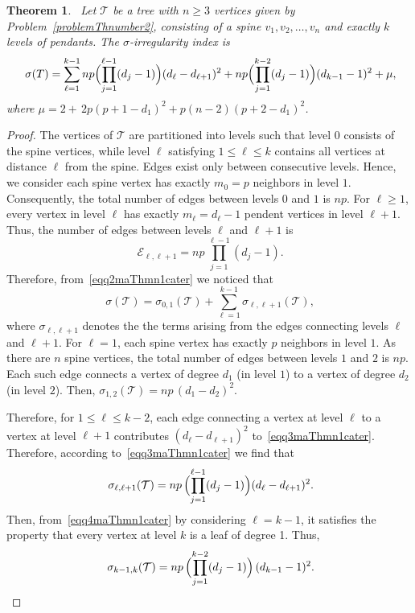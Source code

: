 \documentclass[12pt, a4paper]{article}
\theoremstyle{plain}  %
\newtheorem{theorem}{Theorem}[section]
\theoremstyle{definition}  %
\newcommand{\TT}{\mathcal{T}}
\begin{document}
\begin{theorem}~\label{maThmn1cater}
Let $\TT$ be a tree with $n \geq 3$ vertices given by Problem~\ref{problemThnumber2}, consisting of a spine $v_1, v_2, \dots, v_n$ and exactly $k$ levels of pendants. The $\sigma$-irregularity index is
\begin{equation}~\label{eqq1maThmn1cater}
\sigma(T)=\sum_{\ell=1}^{k-1} np\Bigl(\prod_{j=1}^{\ell-1}(d_j-1)\Bigr)(d_\ell-d_{\ell+1})^2+np\Bigl(\prod_{j=1}^{k-2}(d_j-1)\Bigr)(d_{k-1}-1)^2+\mu,
\end{equation}
where $\mu=2+\,2p(p+1-d_1)^2+p(n-2)(p+2-d_1)^2$.
\end{theorem}
\begin{proof}
The vertices of $\TT$ are partitioned into levels such that level $0$ consists of the spine vertices, while level $\ell$ satisfying $1\leqslant\ell\leqslant k$ contains all vertices at distance $\ell$ from the spine. Edges exist only between consecutive levels. Hence, we consider each spine vertex has exactly $m_0=p$ neighbors in level $1$. Consequently, the total number of edges between levels $0$ and $1$ is $np$.
For $\ell \geqslant 1$, every vertex in level $\ell$ has exactly $m_\ell=d_\ell-1$ pendent vertices in level $\ell+1$. Thus, the number of edges between levels $\ell$ and $\ell+1$ is
\begin{equation}~\label{eqq2maThmn1cater}
\mathcal{E}_{\ell,\ell+1}=np\,\prod_{j=1}^{\ell-1} (d_j-1).
\end{equation}
Therefore, from~\eqref{eqq2maThmn1cater} we noticed that
\begin{equation}~\label{eqq3maThmn1cater}
\sigma(\TT)=\sigma_{0,1}(\TT)+\sum_{\ell=1}^{k-1}\sigma_{\ell,\ell+1}(\TT),
\end{equation}
where $\sigma_{\ell,\ell+1}$ denotes the the terms arising from the edges connecting levels $\ell$ and $\ell+1$. For $\ell=1$, each spine vertex has exactly $p$ neighbors in level $1$. As there are $n$ spine vertices, the total number of edges between levels $1$ and $2$ is $np$. Each such edge connects a vertex of degree $d_1$ (in level $1$) to a vertex of degree $d_2$ (in level $2$). Then, $\sigma_{1,2}(\TT)=np\,(d_1-d_2)^2.$

Therefore, for $1 \leqslant \ell \leqslant k-2$, each edge connecting a vertex at level $\ell$ to a vertex at level $\ell+1$ contributes $(d_\ell-d_{\ell+1})^2$ to~\eqref{eqq3maThmn1cater}.  Therefore, according to~\eqref{eqq3maThmn1cater} we find that
\begin{equation}~\label{eqq4maThmn1cater}
\sigma_{\ell,\ell+1}(\TT)=np\,\Bigl(\prod_{j=1}^{\ell-1} (d_j-1)\Bigr)(d_\ell-d_{\ell+1})^2.
\end{equation}
Then, from~\eqref{eqq4maThmn1cater} by considering $\ell=k-1$, it satisfies the property that every vertex at level $k$ is a leaf of degree 1. Thus, 
\begin{equation}~\label{eqq5maThmn1cater}
\sigma_{k-1,k}(\TT)=np\,\Bigl(\prod_{j=1}^{k-2} (d_j-1)\Bigr)\,(d_{k-1}-1)^2.
\end{equation}


\end{proof}
\end{document}
